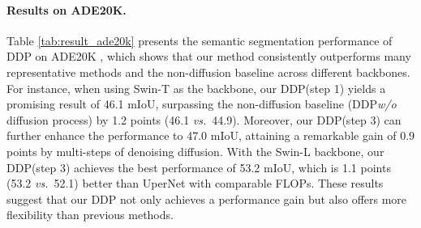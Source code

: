\documentclass[10pt,twocolumn,letterpaper]{article}
\newcommand{\ours}[0]{DDP\xspace}
\begin{document}
\paragraph{Results on ADE20K.}
Table \ref{tab:result_ade20k} presents the semantic segmentation performance of \ours on  ADE20K \cite{zhou2017scene}, which shows that our method consistently outperforms many representative methods \cite{xiao2018unified,cui2022region,zhang2021k,bousselham2021efficient} and the non-diffusion baseline across different backbones.
For instance, when using Swin-T \cite{liu2021swin} as the backbone, our \ours (step 1) yields a promising result of 46.1 mIoU, surpassing the non-diffusion baseline (\ours \emph{w/o} diffusion process)  by 1.2 points (46.1 \emph{vs.}~44.9).
Moreover, our \ours (step 3) can further enhance the performance to 47.0 mIoU, attaining a remarkable gain of 0.9 points by multi-steps of denoising diffusion.
With the Swin-L backbone, our \ours (step 3) achieves the best performance of 53.2 mIoU, which is 1.1 points (53.2 \emph{vs.}~52.1) better than UperNet with comparable FLOPs.
These results suggest that our \ours not only achieves a performance gain but also offers more flexibility than previous methods.
\end{document}
